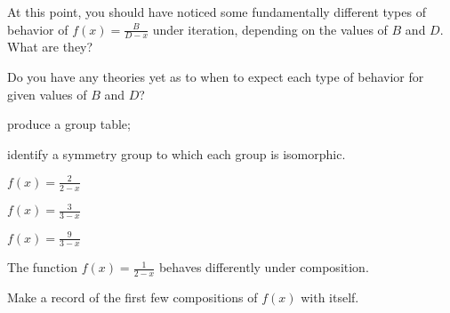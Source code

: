 \documentclass[../key.tex]{subfiles}
\begin{document}
\begin{outer_problem}
\item
\end{outer_problem}

\begin{inner_problem}[start=1]
\item At this point, you should have noticed some fundamentally different types of behavior of $f(x)=\frac{B}{D-x}$ under iteration, depending on the values of $B$ and $D$. What are they?
\end{inner_problem}

\begin{inner_problem}
\item Do you have any theories yet as to when to expect each type of behavior for given values of $B$ and $D$?
\end{inner_problem}

\begin{outer_problem}
\item produce a group table;
\end{outer_problem}

\begin{outer_problem}
\item identify a symmetry group to which each group is isomorphic.
\end{outer_problem}

\begin{outer_problem}
\item \label{prob:compose_start}$f(x)=\frac{2}{2-x}$
\end{outer_problem}

\begin{outer_problem}
\item $f(x)=\frac{3}{3-x}$
\end{outer_problem}

\begin{outer_problem}
\item \label{prob:compose_end}$f(x)=\frac{9}{3-x}$
\end{outer_problem}

\begin{outer_problem}
\item The function $f(x)=\frac{1}{2-x}$ behaves differently under composition.
\end{outer_problem}

\begin{inner_problem}[start=1]
\item Make a record of the first few compositions of $f(x)$ with itself.
\end{inner_problem}
\end{document}
